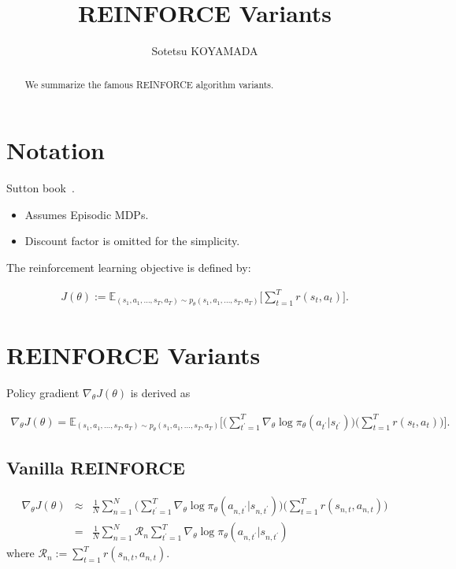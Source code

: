 \documentclass{article}
\title{REINFORCE Variants}
\author{
Sotetsu KOYAMADA
}
\begin{document}
\maketitle

\tableofcontents

\begin{abstract}
We summarize the famous REINFORCE algorithm variants.
\end{abstract}

\section{Notation}
Sutton book~\cite{Sutton2018-ij}.


\begin{itemize}
	\item Assumes Episodic MDPs. 
	\item Discount factor is omitted for the simplicity.
\end{itemize}

The reinforcement learning objective is defined by:

\begin{eqnarray}
J(\theta) := \mathbb{E}_{(s_1, a_1, \ldots, s_T, a_T) \sim p_\theta(s_1, a_1, \ldots, s_T, a_T)} \Biggl[ \sum_{t=1}^{T} r(s_t, a_t) \Biggr].
\end{eqnarray}

\section{REINFORCE Variants}

Policy gradient $\nabla_\theta J(\theta)$ is derived as

\begin{eqnarray}
\nabla_\theta J(\theta) 
= \mathbb{E}_{(s_1, a_1, \ldots, s_T, a_T) \sim p_\theta(s_1, a_1, \ldots, s_T, a_T)} \Biggl[ \Biggl(\sum_{t^\prime=1}^{T} \nabla_\theta \log \pi_\theta (a_{t^\prime}|s_{t^\prime}) \Biggr) \Biggl( \sum_{t=1}^T r(s_t, a_t) \Biggr) \Biggr].
\end{eqnarray}

\subsection{Vanilla REINFORCE}

\begin{eqnarray}
\nabla_\theta J(\theta) 
&\approx& \frac{1}{N} \sum_{n=1}^{N} \Biggl( \sum_{t^\prime=1}^{T} \nabla_\theta \log \pi_\theta (a_{n, t^\prime}|s_{n, t^\prime}) \Biggr) \Biggl( \sum_{t=1}^T r(s_{n, t}, a_{n, t}) \Biggr) \\
&=& \frac{1}{N} \sum_{n=1}^{N} \mathcal{R}_n \sum_{t^\prime=1}^{T} \nabla_\theta \log \pi_\theta (a_{n, t^\prime}|s_{n, t^\prime}) 
\end{eqnarray}
where $\mathcal{R}_{n} := \sum_{t=1}^T r(s_{n, t}, a_{n, t})$.
\end{document}
